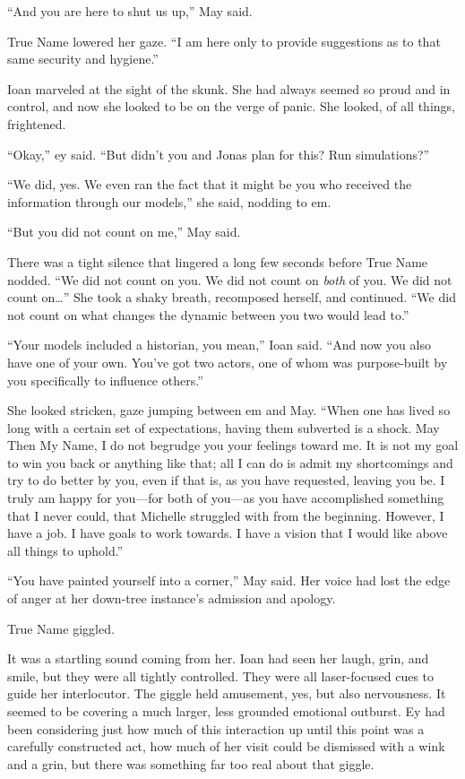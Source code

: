 ``And you are here to shut us up,'' May said.

True Name lowered her gaze. ``I am here only to provide suggestions as to that same security and hygiene.''

Ioan marveled at the sight of the skunk. She had always seemed so proud and in control, and now she looked to be on the verge of panic. She looked, of all things, frightened.

``Okay,'' ey said. ``But didn't you and Jonas plan for this? Run simulations?''

``We did, yes. We even ran the fact that it might be you who received the information through our models,'' she said, nodding to em.

``But you did not count on me,'' May said.

There was a tight silence that lingered a long few seconds before True Name nodded. ``We did not count on you. We did not count on \emph{both} of you. We did not count on\ldots{}'' She took a shaky breath, recomposed herself, and continued. ``We did not count on what changes the dynamic between you two would lead to.''

``Your models included a historian, you mean,'' Ioan said. ``And now you also have one of your own. You've got two actors, one of whom was purpose-built by you specifically to influence others.''

She looked stricken, gaze jumping between em and May. ``When one has lived so long with a certain set of expectations, having them subverted is a shock. May Then My Name, I do not begrudge you your feelings toward me. It is not my goal to win you back or anything like that; all I can do is admit my shortcomings and try to do better by you, even if that is, as you have requested, leaving you be. I truly am happy for you—for both of you—as you have accomplished something that I never could, that Michelle struggled with from the beginning. However, I have a job. I have goals to work towards. I have a vision that I would like above all things to uphold.''

``You have painted yourself into a corner,'' May said. Her voice had lost the edge of anger at her down-tree instance's admission and apology.

True Name giggled.

It was a startling sound coming from her. Ioan had seen her laugh, grin, and smile, but they were all tightly controlled. They were all laser-focused cues to guide her interlocutor. The giggle held amusement, yes, but also nervousness. It seemed to be covering a much larger, less grounded emotional outburst. Ey had been considering just how much of this interaction up until this point was a carefully constructed act, how much of her visit could be dismissed with a wink and a grin, but there was something far too real about that giggle.


